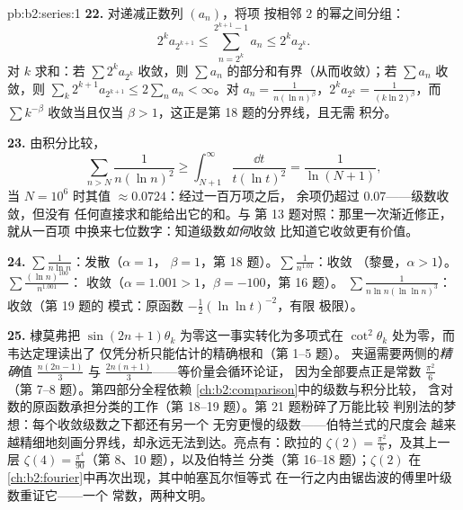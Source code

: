 \begin{solution}{pb:b2:series:1}
\textbf{22.} 对递减正数列 $(a_n)$，将项
按相邻 $2$ 的幂之间分组：
\[
2^{k}a_{2^{k+1}} \leq \sum_{n=2^k}^{2^{k+1}-1} a_n \leq
2^ka_{2^k} .
\]
对 $k$ 求和：若 $\sum 2^ka_{2^k}$ 收敛，则
$\sum a_n$ 的部分和有界（从而收敛）；若
$\sum a_n$ 收敛，则 $\sum_k 2^{k+1}a_{2^{k+1}} \leq 2\sum_n a_n <
\infty$。对 $a_n = \frac1{n(\ln n)^\beta}$，$2^ka_{2^k} =
\frac{1}{(k\ln 2)^\beta}$，而 $\sum k^{-\beta}$ 收敛当且仅当
$\beta > 1$，这正是第 18 题的分界线，且无需
积分。

\textbf{23.} 由积分比较，
\[
\sum_{n > N}\frac{1}{n(\ln n)^2} \geq
\int_{N+1}^{\infty}\frac{\dd t}{t(\ln t)^2} =
\frac{1}{\ln(N+1)},
\]
当 $N = 10^6$ 时其值 $\approx 0.0724$：经过一百万项之后，
余项仍超过 $0.07$——级数收敛，但没有
任何直接求和能给出它的和。与
第 13 题对照：那里一次渐近修正，就从一百项
中换来七位数字：知道级数\emph{如何}收敛
比知道它收敛更有价值。

\textbf{24.} $\sum\frac1{n\ln n}$：发散（$\alpha = 1$，
$\beta = 1$，第 18 题）。$\sum\frac1{n^{1.01}}$：收敛
（黎曼，$\alpha > 1$）。$\sum\frac{(\ln n)^{100}}{n^{1.001}}$：
收敛（$\alpha = 1.001 > 1$，$\beta = -100$，第 16 题）。
$\sum\frac1{n\ln n(\ln\ln n)^3}$：收敛（第 19 题的
模式：原函数 $-\frac12(\ln\ln t)^{-2}$，有限
极限）。

\textbf{25.} 棣莫弗把 $\sin(2n{+}1)
\theta_k$ 为零这一事实转化为多项式在
$\cot^2\theta_k$ 处为零，而韦达定理读出了
仅凭分析只能估计的精确根和（第 1--5 题）。
夹逼需要两侧的\emph{精确}值 $\frac{n(2n-1)}3$ 与
$\frac{2n(n+1)}3$——等价量会循环论证，
因为全部要点正是常数
$\frac{\pi^2}6$（第 7--8 题）。第四部分全程依赖
\cref{ch:b2:comparison}中的级数与积分比较，
含对数的原函数承担分类的工作（第
18--19 题）。第 21 题粉碎了万能比较
判别法的梦想：每个收敛级数之下都还有另一个
无穷更慢的级数——伯特兰式的尺度会
越来越精细地刻画分界线，却永远无法到达。亮点有：欧拉的 $\zeta(2)
= \frac{\pi^2}6$，及其上一层 $\zeta(4) =
\frac{\pi^4}{90}$（第 8、10 题），以及伯特兰
分类（第 16--18 题）；$\zeta(2)$ 在
\cref{ch:b2:fourier}中再次出现，其中帕塞瓦尔恒等式
在一行之内由锯齿波的傅里叶级数重证它——一个
常数，两种文明。
\end{solution}
